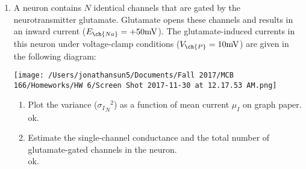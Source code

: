 \documentclass[11pt]{article}
\begin{document}
\begin{enumerate}[label=\arabic*.]
\begin{enumerate}[label=(\alph*)]
\end{enumerate}



\newpage
\item
A neuron contains $N$ identical channels that are gated by the neurotransmitter glutamate. Glutamate opens these channels and results in an inward  current ($E_{\ch{Na}} = +50 \text{mV}$). The glutamate-induced currents in this neuron under voltage-clamp conditions ($V_{\ch{P}} = 10 \text{mV}$) are given in the following diagram:
\begin{center}
\texttt{[image: /Users/jonathansun5/Documents/Fall 2017/MCB 166/Homeworks/HW 6/Screen Shot 2017-11-30 at 12.17.53 AM.png]}
\end{center}
\begin{enumerate}[label=(\alph*)]
\item
Plot the variance (${{\sigma_{I}}_{N}}^2$) as a function of mean current $\mu_{I}$ on graph paper.
\vspace*{1\baselineskip}
\\
ok.












\item
Estimate the single-channel conductance and the total number of glutamate-gated channels in the neuron.
\vspace*{1\baselineskip}
\\
ok.











\end{enumerate}
\end{enumerate}
\end{document}
